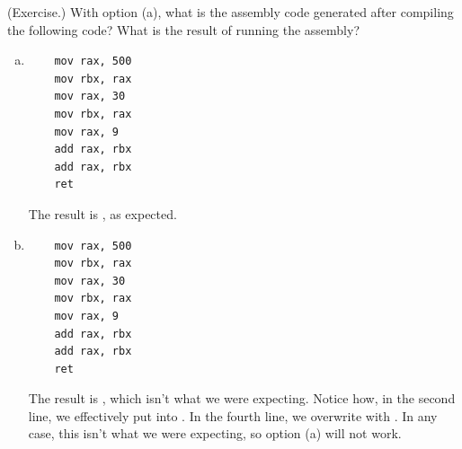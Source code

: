 \documentclass[letterpaper]{article}
\begin{document}
\begin{mdframed}
    (Exercise.) With option (a), what is the assembly code generated after compiling the following code? What is the result of running the assembly? 
    \begin{enumerate}[(a)]
        \item {}
        \begin{mdframed}
            \begin{verbatim}
	mov rax, 500
	mov rbx, rax
	mov rax, 30
	mov rbx, rax
	mov rax, 9
	add rax, rbx
	add rax, rbx
	ret\end{verbatim}
            The result is , as expected.
        \end{mdframed}

        \item {}
        \begin{mdframed}
            \begin{verbatim}
	mov rax, 500
	mov rbx, rax
	mov rax, 30
	mov rbx, rax
	mov rax, 9
	add rax, rbx
	add rax, rbx
	ret\end{verbatim}
            The result is , which isn't what we were expecting. Notice how, in the second line, we effectively put  into . In the fourth line, we overwrite  with . In any case, this isn't what we were expecting, so option (a) will not work. 
        \end{mdframed}
    \end{enumerate}
\end{mdframed}
\end{document}
